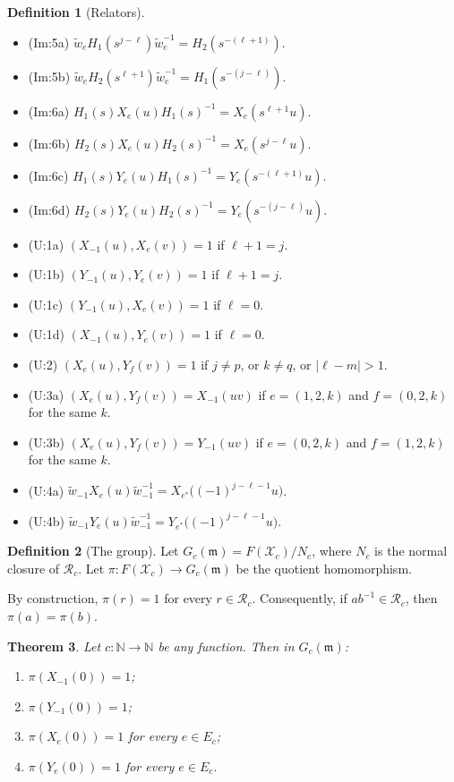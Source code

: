 \documentclass[11pt]{article}
\newtheorem{theorem}{Theorem}[section]
\theoremstyle{definition}
\newtheorem{definition}[theorem]{Definition}
\theoremstyle{remark}
\newcommand{\Gc}{G_c(\mathfrak{m})}
\begin{document}
\begin{definition}[Relators]
\begin{itemize}
\item (Im:5a) $\widetilde w_eH_1(s^{j-\ell})\widetilde w_e^{-1}=H_2(s^{-(\ell+1)})$.
\item (Im:5b) $\widetilde w_eH_2(s^{\ell+1})\widetilde w_e^{-1}=H_1(s^{-(j-\ell)})$.
\item (Im:6a) $H_1(s)X_e(u)H_1(s)^{-1}=X_e(s^{\ell+1}u)$.
\item (Im:6b) $H_2(s)X_e(u)H_2(s)^{-1}=X_e(s^{j-\ell}u)$.
\item (Im:6c) $H_1(s)Y_e(u)H_1(s)^{-1}=Y_e(s^{-(\ell+1)}u)$.
\item (Im:6d) $H_2(s)Y_e(u)H_2(s)^{-1}=Y_e(s^{-(j-\ell)}u)$.
\item (U:1a) $(X_{-1}(u),X_e(v))=1$ if $\ell+1=j$.
\item (U:1b) $(Y_{-1}(u),Y_e(v))=1$ if $\ell+1=j$.
\item (U:1c) $(Y_{-1}(u),X_e(v))=1$ if $\ell=0$.
\item (U:1d) $(X_{-1}(u),Y_e(v))=1$ if $\ell=0$.
\item (U:2) $(X_e(u),Y_f(v))=1$ if $j\ne p$, or $k\ne q$, or $|\ell-m|>1$.
\item (U:3a) $(X_e(u),Y_f(v))=X_{-1}(uv)$ if $e=(1,2,k)$ and $f=(0,2,k)$ for the same $k$.
\item (U:3b) $(X_e(u),Y_f(v))=Y_{-1}(uv)$ if $e=(0,2,k)$ and $f=(1,2,k)$ for the same $k$.
\item (U:4a) $\widetilde w_{-1}X_e(u)\widetilde w_{-1}^{-1}=X_{e^\ast}\big((-1)^{j-\ell-1}u\big)$.
\item (U:4b) $\widetilde w_{-1}Y_e(u)\widetilde w_{-1}^{-1}=Y_{e^\ast}\big((-1)^{j-\ell-1}u\big)$.
\end{itemize}
\end{definition}

\begin{definition}[The group]
Let $\Gc=F(\mathcal{X}_c)/N_c$, where $N_c$ is the normal closure of $\mathcal{R}_c$. Let $\pi\colon F(\mathcal{X}_c)\to\Gc$ be the quotient homomorphism.

By construction, $\pi(r)=1$ for every $r\in\mathcal{R}_c$. Consequently, if $ab^{-1}\in\mathcal{R}_c$, then $\pi(a)=\pi(b)$.
\end{definition}

\begin{theorem}\label{thm:main}
Let $c\colon\mathbb{N}\to\mathbb{N}$ be any function. Then in $\Gc$:
\begin{enumerate}
\item[(a)] $\pi(X_{-1}(0))=1$;
\item[(b)] $\pi(Y_{-1}(0))=1$;
\item[(c)] $\pi(X_e(0))=1$ for every $e\in E_c$;
\item[(d)] $\pi(Y_e(0))=1$ for every $e\in E_c$.
\end{enumerate}
\end{theorem}
\end{document}
